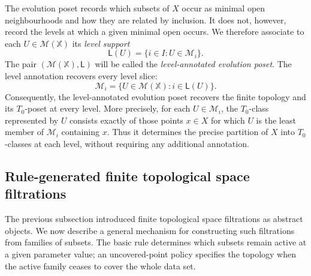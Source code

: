 \documentclass[a4paper,11pt]{article}
\theoremstyle{definition}
\theoremstyle{remark}
\begin{document}
The evolution poset records which subsets of $X$ occur as minimal open neighbourhoods and how they are related by inclusion. It does not, however, record the levels at which a given minimal open occurs. We therefore associate to each $U\in\mathcal M(\mathbb X)$ its \emph{level support}
$$
\mathsf L(U) = \{i\in I\colon U\in\mathcal M_i\}.
$$
The pair $(\mathcal M(\mathbb X),\mathsf L)$ will be called the \emph{level-annotated evolution poset}. The level annotation recovers every level slice:
$$
\mathcal M_i = \{U\in\mathcal M(\mathbb X)\colon i\in\mathsf L(U)\}.
$$
Consequently, the level-annotated evolution poset recovers the finite topology and its $T_0$-poset at every level. More precisely, for each $U\in\mathcal M_i$, the $T_0$-class represented by $U$ consists exactly of those points $x\in X$ for which $U$ is the least member of $\mathcal M_i$ containing $x$. Thus it determines the precise partition of $X$ into $T_0$-classes at each level, without requiring any additional annotation.



\subsection{Rule-generated finite topological space filtrations}
\label{subsec:rule-based}

The previous subsection introduced finite topological space filtrations as abstract objects. We now describe a general mechanism for constructing such filtrations from families of subsets. The basic rule determines which subsets remain active at a given parameter value; an uncovered-point policy specifies the topology when the active family ceases to cover the whole data set.

\end{document}
